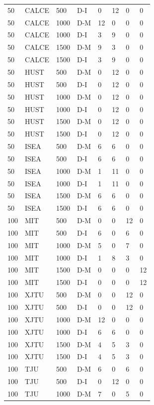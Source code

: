 \documentclass[10pt,a4paper]{article}
\begin{document}
{\begin{longtable}{@{\extracolsep{\fill}}llllllll}
50 & CALCE & 500 & D-I & 0 & 12 & 0 & 0\\
50 & CALCE & 1000 & D-M & 12 & 0 & 0 & 0\\
50 & CALCE & 1000 & D-I & 3 & 9 & 0 & 0\\
50 & CALCE & 1500 & D-M & 9 & 3 & 0 & 0\\
50 & CALCE & 1500 & D-I & 3 & 9 & 0 & 0\\
50 & HUST & 500 & D-M & 0 & 12 & 0 & 0\\
50 & HUST & 500 & D-I & 0 & 12 & 0 & 0\\
50 & HUST & 1000 & D-M & 0 & 12 & 0 & 0\\
50 & HUST & 1000 & D-I & 0 & 12 & 0 & 0\\
50 & HUST & 1500 & D-M & 0 & 12 & 0 & 0\\
50 & HUST & 1500 & D-I & 0 & 12 & 0 & 0\\
50 & ISEA & 500 & D-M & 6 & 6 & 0 & 0\\
50 & ISEA & 500 & D-I & 6 & 6 & 0 & 0\\
50 & ISEA & 1000 & D-M & 1 & 11 & 0 & 0\\
50 & ISEA & 1000 & D-I & 1 & 11 & 0 & 0\\
50 & ISEA & 1500 & D-M & 6 & 6 & 0 & 0\\
50 & ISEA & 1500 & D-I & 6 & 6 & 0 & 0\\
100 & MIT & 500 & D-M & 0 & 0 & 12 & 0\\
100 & MIT & 500 & D-I & 6 & 0 & 6 & 0\\
100 & MIT & 1000 & D-M & 5 & 0 & 7 & 0\\
100 & MIT & 1000 & D-I & 1 & 8 & 3 & 0\\
100 & MIT & 1500 & D-M & 0 & 0 & 0 & 12\\
100 & MIT & 1500 & D-I & 0 & 0 & 0 & 12\\
100 & XJTU & 500 & D-M & 0 & 0 & 12 & 0\\
100 & XJTU & 500 & D-I & 0 & 0 & 12 & 0\\
100 & XJTU & 1000 & D-M & 12 & 0 & 0 & 0\\
100 & XJTU & 1000 & D-I & 6 & 6 & 0 & 0\\
100 & XJTU & 1500 & D-M & 4 & 5 & 3 & 0\\
100 & XJTU & 1500 & D-I & 4 & 5 & 3 & 0\\
100 & TJU & 500 & D-M & 6 & 0 & 6 & 0\\
100 & TJU & 500 & D-I & 0 & 12 & 0 & 0\\
100 & TJU & 1000 & D-M & 7 & 0 & 5 & 0\\

\end{longtable}}
\end{document}
